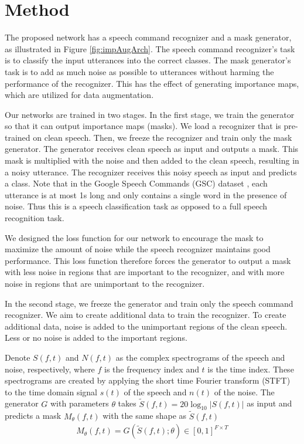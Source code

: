 \documentclass{article}
\begin{document}
\section{Method}

The proposed network has a speech command recognizer and a mask generator, as illustrated in Figure \ref{fig:impAugArch}. The speech command recognizer's task is to classify the input utterances into the correct classes. The mask generator's task is to add as much noise as possible to utterances without harming the performance of the recognizer. This has the effect of generating importance maps, which are utilized for data augmentation. 

Our networks are trained in two stages. In the first stage, we train the generator so that it can output importance maps (masks). We load a recognizer that is pre-trained on clean speech. Then, we freeze the recognizer and train only the mask generator. The generator receives clean speech as input and outputs a mask. This mask is multiplied with the noise and then added to the clean speech, resulting in a noisy utterance. The recognizer receives this noisy speech as input and predicts a class. Note that in the Google Speech Commands (GSC) dataset \cite{warden2018speech}, each utterance is at most 1s long and only contains a single word in the presence of noise. 
Thus this is a speech classification task as opposed to a full speech recognition task.

We designed the loss function for our network to encourage the mask to maximize the amount of noise while the speech recognizer maintains good performance. This loss function therefore forces the generator to output a mask with less noise in regions that are important to the recognizer, and with more noise in regions that are unimportant to the recognizer. 




In the second stage, we freeze the generator and train only the speech command recognizer. We aim to create additional data to train the recognizer. To create additional data, noise is added to the unimportant regions of the clean speech. Less or no noise is added to the important regions. 



Denote $S(f,t) $ and $N(f,t)$ as the complex spectrograms of the speech and noise, respectively, where $f$ is the frequency index and $t$ is the time index. These spectrograms are created by applying the short time Fourier transform (STFT) to the time domain signal $s(t)$ of the speech and $n(t)$ of the noise. The generator $G$ with parameters $\theta$ takes $\tilde{S}(f,t) = 20 \log_{10}|S(f,t)|$ as input and predicts a mask $M_{\theta}(f,t)$ with the same shape as $\tilde{S}(f,t)$
\begin{align}
M_{\theta}(f,t) = G(\tilde{S}(f,t); \theta) \in [0,1]^{F \times T}
\end{align}
\end{document}
